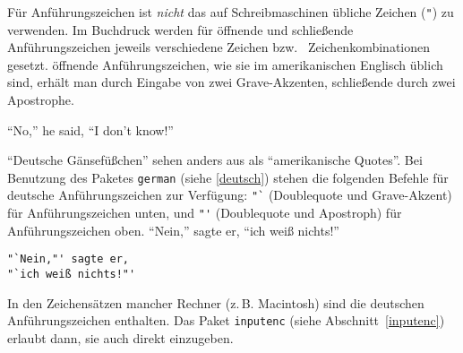 Für Anführungszeichen ist \emph{nicht} das auf Schreibmaschinen
übliche Zeichen (\lstinline|"|) zu verwenden.
Im Buchdruck werden für öffnende und schließende
Anführungszeichen jeweils verschiedene Zeichen bzw.\ %
Zeichenkombinationen gesetzt.
öffnende Anführungszeichen, wie sie im amerikanischen Englisch 
üblich sind, erhält man durch Eingabe von zwei Grave-Akzenten, 
schließende durch zwei Apostrophe.
\begin{LTXexample}
``No,'' he said,
``I don't know!''
\end{LTXexample}
"`Deutsche Gänsefüßchen"' sehen anders aus als ``amerikanische
Quotes''.  
Bei Benutzung des Paketes \texttt{german} (siehe \ref{deutsch})
stehen die folgenden Befehle für 
deutsche Anführungszeichen zur Verfügung:
\lstinline|"`| (Doublequote und Grave-Akzent) für Anführungszeichen
unten,
und
\lstinline|"'| (Doublequote und Apostroph) für Anführungszeichen oben.
\exa
"`Nein,"' sagte er,
"`ich weiß nichts!"'
\exb
\begin{verbatim}
"`Nein,"' sagte er,
"`ich weiß nichts!"'
\end{verbatim}
\exc
In den Zeichensätzen mancher Rechner (z.\,B. Macintosh) sind die deutschen 
Anführungszeichen enthalten.  Das Paket \texttt{inputenc} (siehe
Abschnitt~\ref{inputenc}) erlaubt dann, sie auch direkt einzugeben.


